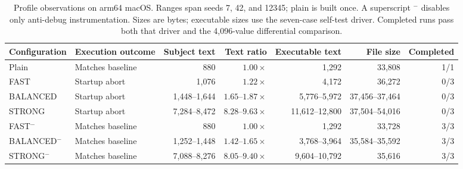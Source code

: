 \begin{table}[t]
\centering\footnotesize
\caption{Profile observations on arm64 macOS. Ranges span seeds 7, 42, and 12345; plain is built once. A superscript $^{-}$ disables only anti-debug instrumentation. Sizes are bytes; executable sizes use the seven-case self-test driver. Completed runs pass both that driver and the 4,096-value differential comparison.}
\label{tab:current-results}
\begin{tabular}{@{}llrrrrr@{}}
\toprule
Configuration & Execution outcome & Subject text & Text ratio & Executable text & File size & Completed \\
\midrule
Plain & Matches baseline & 880 & $1.00\times$ & 1{,}292 & 33{,}808 & 1/1 \\
FAST & Startup abort & 1{,}076 & $1.22\times$ & 4{,}172 & 36{,}272 & 0/3 \\
BALANCED & Startup abort & 1{,}448--1{,}644 & $1.65\text{--}1.87\times$ & 5{,}776--5{,}972 & 37{,}456--37{,}464 & 0/3 \\
STRONG & Startup abort & 7{,}284--8{,}472 & $8.28\text{--}9.63\times$ & 11{,}612--12{,}800 & 37{,}504--54{,}016 & 0/3 \\
\midrule
FAST$^{-}$ & Matches baseline & 880 & $1.00\times$ & 1{,}292 & 33{,}728 & 3/3 \\
BALANCED$^{-}$ & Matches baseline & 1{,}252--1{,}448 & $1.42\text{--}1.65\times$ & 3{,}768--3{,}964 & 35{,}584--35{,}592 & 3/3 \\
STRONG$^{-}$ & Matches baseline & 7{,}088--8{,}276 & $8.05\text{--}9.40\times$ & 9{,}604--10{,}792 & 35{,}616 & 3/3 \\
\bottomrule
\end{tabular}
\end{table}
